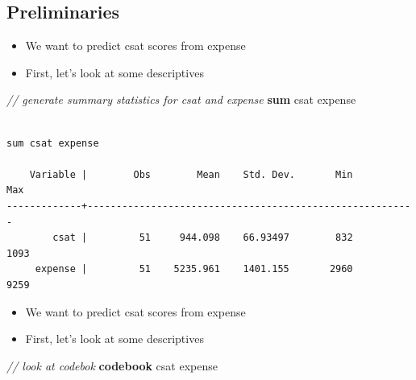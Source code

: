 \documentclass[
]{book}
\newenvironment{Shaded}{\begin{snugshade}}{\end{snugshade}}
\newcommand{\CommentTok}[1]{\textcolor[rgb]{0.56,0.35,0.01}{\textit{#1}}}
\newcommand{\KeywordTok}[1]{\textcolor[rgb]{0.13,0.29,0.53}{\textbf{#1}}}
\newcommand{\NormalTok}[1]{#1}
\providecommand{\tightlist}{%
  \setlength{\itemsep}{0pt}\setlength{\parskip}{0pt}}
\begin{document}
\hypertarget{preliminaries}{%
\subsection{Preliminaries}\label{preliminaries}}

\begin{itemize}
\tightlist
\item
  We want to predict csat scores from expense
\item
  First, let's look at some descriptives
\end{itemize}

\begin{Shaded}
\begin{Highlighting}[]
  \CommentTok{// generate summary statistics for csat and expense}
  \KeywordTok{sum}\NormalTok{ csat expense}
\end{Highlighting}
\end{Shaded}

\begin{verbatim}

sum csat expense

    Variable |        Obs        Mean    Std. Dev.       Min        Max
-------------+---------------------------------------------------------
        csat |         51     944.098    66.93497        832       1093
     expense |         51    5235.961    1401.155       2960       9259
\end{verbatim}

\begin{itemize}
\tightlist
\item
  We want to predict csat scores from expense
\item
  First, let's look at some descriptives
\end{itemize}

\begin{Shaded}
\begin{Highlighting}[]
  \CommentTok{// look at codebok}
  \KeywordTok{codebook}\NormalTok{ csat expense}
\end{Highlighting}
\end{Shaded}
\end{document}
